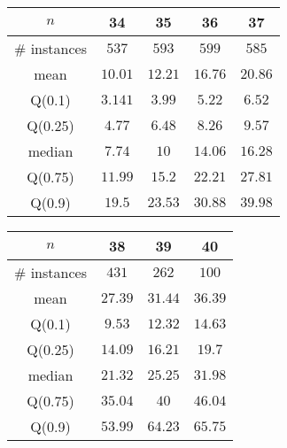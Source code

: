 \begin{tabular}{c|cccc} 
\hline 
$n$ & 34 & 35 & 36 & 37 \tabularnewline 
\hline 
\hline 
\# instances & $537$ & $593$ & $599$ & $585$ \tabularnewline 
mean & $10.01$ & $12.21$ & $16.76$ & $20.86$ \tabularnewline 
Q(0.1) & $3.141$ & $3.99$ & $5.22$ & $6.52$ \tabularnewline 
Q(0.25) & $4.77$ & $6.48$ & $8.26$ & $9.57$ \tabularnewline 
median & $7.74$ & $10$ & $14.06$ & $16.28$ \tabularnewline 
Q(0.75) & $11.99$ & $15.2$ & $22.21$ & $27.81$ \tabularnewline 
Q(0.9) & $19.5$ & $23.53$ & $30.88$ & $39.98$ \tabularnewline 
\hline 
\end{tabular} 
\medskip{} 

\begin{tabular}{c|ccc} 
\hline 
$n$ & 38 & 39 & 40 \tabularnewline 
\hline 
\hline 
\# instances & $431$ & $262$ & $100$ \tabularnewline 
mean & $27.39$ & $31.44$ & $36.39$ \tabularnewline 
Q(0.1) & $9.53$ & $12.32$ & $14.63$ \tabularnewline 
Q(0.25) & $14.09$ & $16.21$ & $19.7$ \tabularnewline 
median & $21.32$ & $25.25$ & $31.98$ \tabularnewline 
Q(0.75) & $35.04$ & $40$ & $46.04$ \tabularnewline 
Q(0.9) & $53.99$ & $64.23$ & $65.75$ \tabularnewline 
\hline 
\end{tabular} 
\medskip{} 

